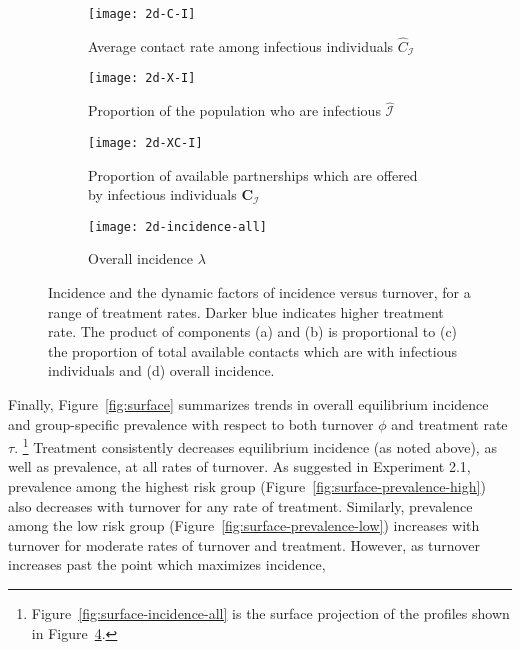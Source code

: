 \begin{figure}[h]
  \centering
  \begin{subfigure}[t]{0.45\linewidth}
    \centering
    \texttt{[image: 2d-C-I]}
    \caption{Average contact rate among infectious individuals $\hat{C}_{\mathcal{I}}$}
    \label{fig:2d-C-I}
  \end{subfigure}
  \begin{subfigure}[t]{0.45\linewidth}
    \centering
    \texttt{[image: 2d-X-I]}
    \caption{Proportion of the population who are infectious $\hat{\mathcal{I}}$}
    \label{fig:2d-X-I}
  \end{subfigure}
  \begin{subfigure}[t]{0.45\linewidth}
    \centering
    \texttt{[image: 2d-XC-I]}
    \caption{Proportion of available partnerships
      which are offered by infectious individuals $\bm{C}_{\mathcal{I}}$}
    \label{fig:2d-XC-I}
  \end{subfigure}
  \begin{subfigure}[t]{0.45\linewidth}
    \centering
    \texttt{[image: 2d-incidence-all]}
    \caption{Overall incidence $\lambda$}
    \label{fig:2d-incidence-all}
  \end{subfigure}
  \caption{Incidence and the dynamic factors of incidence versus turnover,
    for a range of treatment rates.
    Darker blue indicates higher treatment rate.
    The product of components (a) and (b) is proportional to
    (c) the proportion of total available contacts which are with infectious individuals
    and (d) overall incidence.}
  \label{fig:2d-incidence-factors}
\end{figure}
\par
Finally, Figure~\ref{fig:surface} summarizes trends in
overall equilibrium incidence and group-specific prevalence
with respect to both turnover $\phi$ and treatment rate $\tau$.%
\footnote{Figure~\ref{fig:surface-incidence-all}
  is the surface projection of the profiles shown in
  Figure~\ref{fig:2d-incidence-all}.}
Treatment consistently decreases equilibrium incidence (as noted above),
as well as prevalence, at all rates of turnover.
As suggested in Experiment 2.1, prevalence among the highest risk group
(Figure~\ref{fig:surface-prevalence-high})
also decreases with turnover for any rate of treatment.
Similarly, prevalence among the low risk group
(Figure~\ref{fig:surface-prevalence-low})
increases with turnover for moderate rates of turnover and treatment.
However, as turnover increases past the point which maximizes incidence,
